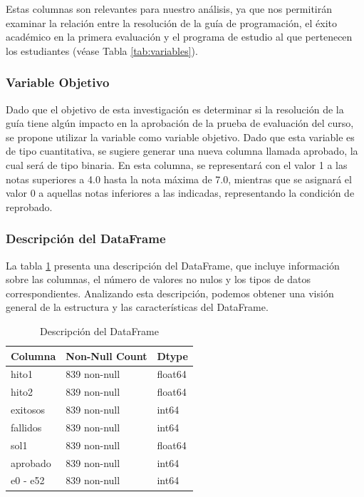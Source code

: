 Estas columnas son relevantes para nuestro análisis, ya que nos permitirán examinar la relación
entre la resolución de la guía de programación, el éxito académico en la primera evaluación y
el programa de estudio al que pertenecen los estudiantes (véase Tabla \ref{tab:variables}).

\subsubsection{Variable Objetivo}

Dado que el objetivo de esta investigación es determinar si la resolución de la guía tiene algún impacto en la aprobación de la prueba de evaluación del curso, se propone utilizar la variable  como variable objetivo. Dado que esta variable es de tipo cuantitativa, se sugiere generar una nueva columna llamada aprobado, la cual será de tipo binaria. En esta columna, se representará con el valor 1 a las notas superiores a 4.0 hasta la nota máxima de 7.0, mientras que se asignará el valor 0 a aquellas notas inferiores a las indicadas, representando la condición de reprobado.

\subsubsection{Descripción del DataFrame}

La tabla \ref{tab:descripcion_dataframe} presenta una descripción del DataFrame, que incluye información sobre las columnas, el número de valores no nulos y los tipos de datos correspondientes. Analizando esta descripción, podemos obtener una visión general de la estructura y las características del DataFrame.

\begin{table}[H]
    \centering
    \caption{Descripción del DataFrame}
    \begin{tabular}{lll}
        \hline
        \textbf{Columna} & \textbf{Non-Null Count} & \textbf{Dtype} \\
        \hline
        hito1            & 839 non-null            & float64        \\
        hito2            & 839 non-null            & float64        \\
        exitosos         & 839 non-null            & int64          \\
        fallidos         & 839 non-null            & int64          \\
        sol1             & 839 non-null            & float64        \\
        aprobado         & 839 non-null            & int64          \\
        e0 - e52         & 839 non-null            & int64          \\
        \hline
    \end{tabular}%
    \label{tab:descripcion_dataframe}%
\end{table}%

